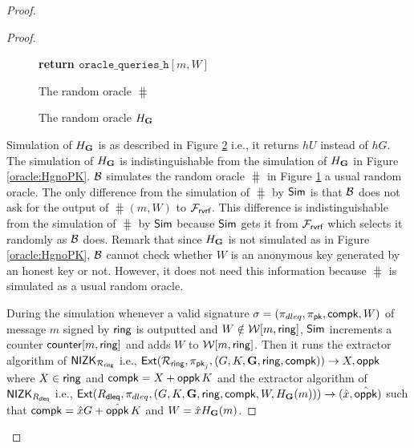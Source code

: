 \begin{proof}
\begin{proof}
\begin{figure}
{{						
						\textbf{return $  \mathtt{oracle\_queries\_h}[m, W] $}
						
				}}	
				\caption{The random oracle $ \hash $}
				\label{oracle:HbyB}
			\end{figure}
			
			\begin{figure}
				\centering
				
				\noindent{}	
				\caption{The random oracle $ H_{\mathbf{G}} $}
				\label{oracle:HgbyB}
			\end{figure}
			
			Simulation of $ H_{\mathbf{G}} $ is as described in Figure \ref{oracle:HgbyB} i.e., it returns $ hU $ instead of $ hG $. The simulation of $ H_{\mathbf{G}} $ is indistinguishable from the simulation of $ H_{\mathbf{G}} $ in Figure \ref{oracle:HgnoPK}. 
			$ \mathcal{B} $ simulates the random oracle $ \hash $ in Figure \ref{oracle:HbyB} a usual random oracle. The only difference from the simulation of $ \hash $ by $ \mathsf{Sim} $ is that $ \mathcal{B} $ does not ask for the output of $ \hash(m,W) $ to $ \mathcal{F}_{\textsf{rvrf}} $. This difference is indistinguishable from the simulation of $ \hash $ by $ \mathsf{Sim} $ because $ \mathsf{Sim} $ gets it from $ \mathcal{F}_{\textsf{rvrf}} $ which selects it randomly as $ \mathcal{B}  $ does. Remark that since $ H_{\mathbf{G}} $ is not simulated as in Figure \ref{oracle:HgnoPK}, $ \mathcal{B} $ cannot check whether $ W $ is an anonymous key generated by an honest key or not.  However, it does not need this information because $ \hash $ is simulated as a usual random oracle.
			
			During the simulation whenever a valid signature $ \sigma = (\pi_{dleq},\pi_{\mathsf{pk}},\mathsf{compk},W) $ of message $ m $ signed by $ \mathsf{ring} $ is outputted and $ W \notin \mathcal{W}[m, \mathsf{ring}] $, $ \mathsf{Sim} $ increments a counter $ \mathsf{counter}[m,\mathsf{ring}] $ and adds $ W $ to $ \mathcal{W}[m,\mathsf{ring}] $.
			Then it runs the extractor algorithm of $ {\mathsf{NIZK}}_{\mathcal{R}_{\mathsf{ring}}} $ i.e., $ \mathsf{Ext}(\mathcal{R}_{\mathsf{ring}},\pi_{\mathsf{pk}_j},(G,K,{\mathbf{G}},\mathsf{ring}, \mathsf{compk}) ) \rightarrow X, \mathsf{oppk}$ where $ X\in \mathsf{ring} $ and $ \mathsf{compk} = X + \mathsf{oppk} \, K $ and the extractor algorithm of $ {\mathsf{NIZK}}_{R_{\mathsf{dleq}}} $ i.e., $ \mathsf{Ext}(R_{\mathsf{dleq}},\pi_{dleq},(G,K,{\mathbf{G}},\mathsf{ring}, \mathsf{compk},W,H_{\mathbf{G}}(m))) \rightarrow (\hat{x},\hat{\mathsf{oppk}} )$ such that $ \mathsf{compk} = \hat{x}G + \hat{\mathsf{oppk}} \, K $ and $ W = \hat{x} H_{\mathbf{G}}(m) $. 
			

\end{proof}
\end{proof}
